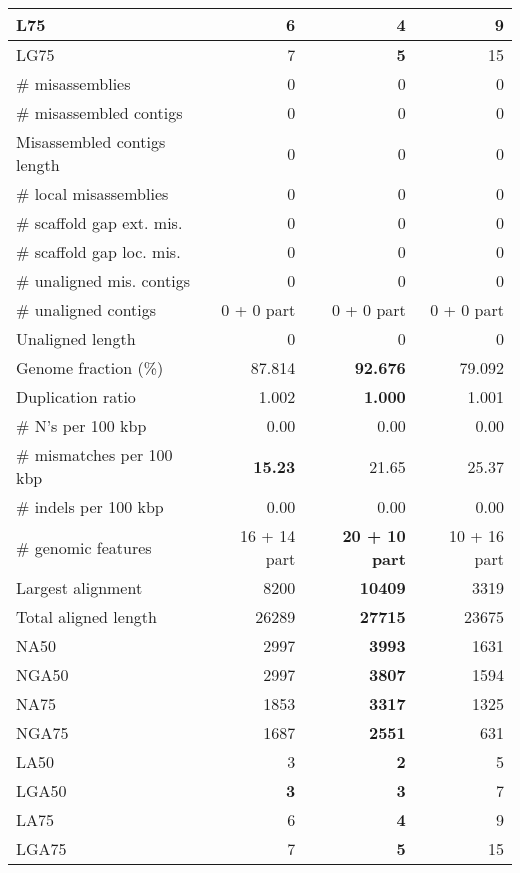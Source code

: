 \documentclass[12pt,a4paper]{article}
\begin{document}
\begin{table}[ht]
\begin{center}
\begin{tabular}{|l*{3}{|r}|}
L75 & 6 & {\bf 4} & 9 \\ \hline
LG75 & 7 & {\bf 5} & 15 \\ \hline
\# misassemblies & 0 & 0 & 0 \\ \hline
\# misassembled contigs & 0 & 0 & 0 \\ \hline
Misassembled contigs length & 0 & 0 & 0 \\ \hline
\# local misassemblies & 0 & 0 & 0 \\ \hline
\# scaffold gap ext. mis. & 0 & 0 & 0 \\ \hline
\# scaffold gap loc. mis. & 0 & 0 & 0 \\ \hline
\# unaligned mis. contigs & 0 & 0 & 0 \\ \hline
\# unaligned contigs & 0 + 0 part & 0 + 0 part & 0 + 0 part \\ \hline
Unaligned length & 0 & 0 & 0 \\ \hline
Genome fraction (\%) & 87.814 & {\bf 92.676} & 79.092 \\ \hline
Duplication ratio & 1.002 & {\bf 1.000} & 1.001 \\ \hline
\# N's per 100 kbp & 0.00 & 0.00 & 0.00 \\ \hline
\# mismatches per 100 kbp & {\bf 15.23} & 21.65 & 25.37 \\ \hline
\# indels per 100 kbp & 0.00 & 0.00 & 0.00 \\ \hline
\# genomic features & 16 + 14 part & {\bf 20 + 10 part} & 10 + 16 part \\ \hline
Largest alignment & 8200 & {\bf 10409} & 3319 \\ \hline
Total aligned length & 26289 & {\bf 27715} & 23675 \\ \hline
NA50 & 2997 & {\bf 3993} & 1631 \\ \hline
NGA50 & 2997 & {\bf 3807} & 1594 \\ \hline
NA75 & 1853 & {\bf 3317} & 1325 \\ \hline
NGA75 & 1687 & {\bf 2551} & 631 \\ \hline
LA50 & 3 & {\bf 2} & 5 \\ \hline
LGA50 & {\bf 3} & {\bf 3} & 7 \\ \hline
LA75 & 6 & {\bf 4} & 9 \\ \hline
LGA75 & 7 & {\bf 5} & 15 \\ \hline
\end{tabular}
\end{center}
\end{table}
\end{document}
